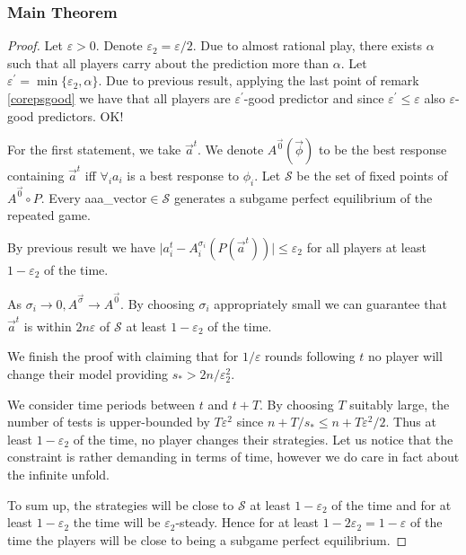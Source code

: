 \documentclass[]{spie}  %
\begin{document}
\subsubsection{Main Theorem}
\begin{proof}
Let $\varepsilon > 0$. Denote $\varepsilon_2 = \varepsilon/2$. Due to almost rational play, there exists $\alpha$ such that all players carry about the prediction more than $\alpha$. Let $\varepsilon^{'} = \min \{ \varepsilon_2, \alpha \}$. Due to previous result, applying the last point of remark \autoref{corepsgood} we have that all players are $\varepsilon^{'}$-good predictor and since $\varepsilon^{'} \leq \varepsilon$ also $\varepsilon$-good predictors. OK!

For the first statement, we take $\overrightarrow{a}^t$. We denote $A^{\overrightarrow{0}}(\overrightarrow{\phi})$ to be the best response containing $\overrightarrow{a}^t$ iff $\forall_i a_i$ is a best response to $\phi_i$. Let $\mathcal{S}$ be the set of fixed points of $A^{\overrightarrow{0}} \circ P$. Every \gls{aaa_vector}$\in \mathcal{S}$ generates a subgame perfect equilibrium of the repeated game.

By previous result we have $\lvert a_i^t - A_i^{\sigma_i}(P(\overrightarrow{a}^t)) \rvert \leq \varepsilon_2$ for all players at least $1-\varepsilon_2$ of the time. 

As $\sigma_i \xrightarrow[]{} 0, A^{\overrightarrow{\sigma}} \xrightarrow[]{} A^{\overrightarrow{0}}$. By choosing $\sigma_i$ appropriately small we can guarantee that $\overrightarrow{a}^t$ is within $2n\varepsilon$ of $\mathcal{S}$ at least $1-\varepsilon_2$ of the time.

We finish the proof with claiming that for $1/\varepsilon$ rounds following $t$ no player will change their model providing $s_* > 2n/\varepsilon_2^2$. 

We consider time periods between $t$ and $t+T$. By choosing $T$ suitably large, the number of tests is upper-bounded by $T\varepsilon^2$ since $n+T/s_* \leq n + T\varepsilon^2/2$. Thus at least $1-\varepsilon_2$ of the time, no player changes their strategies. Let us notice that the constraint is rather demanding in terms of time, however we do care in fact about the infinite unfold.

To sum up, the strategies will be close to $\mathcal{S}$ at least $1-\varepsilon_2$ of the time and for at least $1-\varepsilon_2$ the time will be $\varepsilon_2$-steady. Hence for at least $1-2\varepsilon_2 = 1-\varepsilon$ of the time the players will be close to being a subgame perfect equilibrium.
\end{proof}
\end{document}
